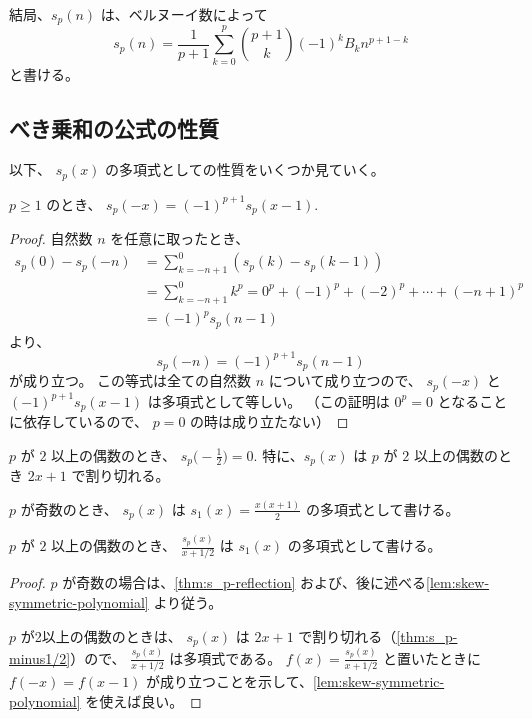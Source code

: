 {結局、$s_p(n)$ は、ベルヌーイ数によって
\begin{equation} \label{eq:s_p-with-bernoulli-numbers}
  s_p(n)=\frac{1}{p+1}\sum_{k=0}^{p} \binom{p+1}{k} (-1)^{k} B_{k} n^{p+1-k}
\end{equation}
と書ける。

\subsection{べき乗和の公式の性質}
以下、 $s_p(x)$ の多項式としての性質をいくつか見ていく。

\begin{theorem} \label{thm:s_p-reflection}
  $p\ge 1$ のとき、
  $s_p(-x)=(-1)^{p+1}s_p(x-1)$.
\end{theorem}
\begin{proof}
  自然数 $n$ を任意に取ったとき、
  \begin{align*}
    s_p(0)-s_p(-n)
    &=\sum_{k=-n+1}^{0} (s_p(k)-s_p(k-1)) \\
    &=\sum_{k=-n+1}^{0} k^p
     =0^p+(-1)^p+(-2)^p+\dotsb+(-n+1)^p \\
    &=(-1)^p s_p(n-1)
  \end{align*}
  より、
  \[s_p(-n)=(-1)^{p+1} s_p(n-1)\]
  が成り立つ。
  この等式は全ての自然数 $n$ について成り立つので、 $s_p(-x)$ と $(-1)^{p+1} s_p(x-1)$ は多項式として等しい。
  （この証明は $0^p=0$ となることに依存しているので、 $p=0$ の時は成り立たない）
\end{proof}

\begin{corollary} \label{thm:s_p-minus1/2}
  $p$ が $2$ 以上の偶数のとき、
  $s_p\bigl(-\frac12\bigr)=0$.
  特に、$s_p(x)$ は $p$ が $2$ 以上の偶数のとき $2x+1$ で割り切れる。
\end{corollary}

\begin{theorem}[Faulhaber] \label{thm:Faulhaber}
  $p$ が奇数のとき、 $s_p(x)$ は $s_1(x)=\frac{x(x+1)}{2}$ の多項式として書ける。

  $p$ が $2$ 以上の偶数のとき、 $\frac{s_p(x)}{x+1/2}$ は $s_1(x)$ の多項式として書ける。
\end{theorem}
\begin{proof}
  $p$ が奇数の場合は、\autoref{thm:s_p-reflection} および、後に述べる\autoref{lem:skew-symmetric-polynomial} より従う。

  $p$ が2以上の偶数のときは、 $s_p(x)$ は $2x+1$ で割り切れる（\autoref{thm:s_p-minus1/2}）ので、 $\frac{s_p(x)}{x+1/2}$ は多項式である。
  $f(x)=\frac{s_p(x)}{x+1/2}$ と置いたときに $f(-x)=f(x-1)$ が成り立つことを示して、\autoref{lem:skew-symmetric-polynomial} を使えば良い。
\end{proof}

}
